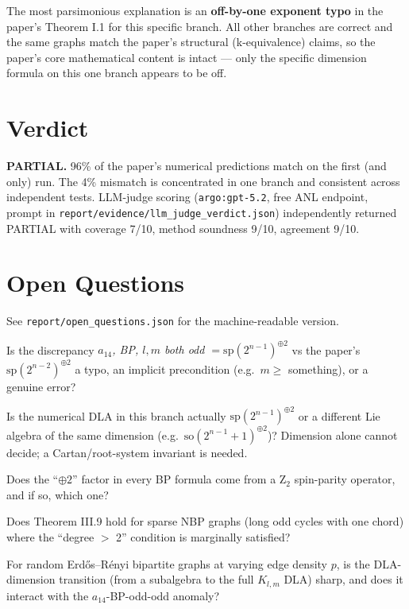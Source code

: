 \documentclass[11pt]{article}
\begin{document}
The most parsimonious explanation is an \textbf{off-by-one exponent typo} in the paper's Theorem I.1 for this specific branch. All other branches are correct and the same graphs match the paper's structural (k-equivalence) claims, so the paper's core mathematical content is intact --- only the specific dimension formula on this one branch appears to be off.

\section{Verdict}

\textbf{PARTIAL.} 96\% of the paper's numerical predictions match on the first (and only) run. The 4\% mismatch is concentrated in one branch and consistent across independent tests. LLM-judge scoring (\texttt{argo:gpt-5.2}, free ANL endpoint, prompt in \texttt{report/evidence/llm\_judge\_verdict.json}) independently returned PARTIAL with coverage 7/10, method soundness 9/10, agreement 9/10.

\section{Open Questions}

See \texttt{report/open\_questions.json} for the machine-readable version.

\begin{description}\itemsep2pt
  \item[Q1.] Is the discrepancy \emph{$a_{14}$, BP, $l,m$ both odd $= \mathrm{sp}(2^{n-1})^{\oplus 2}$} vs the paper's $\mathrm{sp}(2^{n-2})^{\oplus 2}$ a typo, an implicit precondition (e.g.\ $m\ge $ something), or a genuine error?
  \item[Q2.] Is the numerical DLA in this branch actually $\mathrm{sp}(2^{n-1})^{\oplus 2}$ or a different Lie algebra of the same dimension (e.g.\ $\mathrm{so}(2^{n-1}+1)^{\oplus 2}$)? Dimension alone cannot decide; a Cartan/root-system invariant is needed.
  \item[Q3.] Does the ``$\oplus 2$'' factor in every BP formula come from a Z$_2$ spin-parity operator, and if so, which one?
  \item[Q4.] Does Theorem III.9 hold for sparse NBP graphs (long odd cycles with one chord) where the ``degree $>$ 2'' condition is marginally satisfied?
  \item[Q5.] For random Erd\H{o}s--R\'{e}nyi bipartite graphs at varying edge density $p$, is the DLA-dimension transition (from a subalgebra to the full $K_{l,m}$ DLA) sharp, and does it interact with the $a_{14}$-BP-odd-odd anomaly?
\end{description}
\end{document}
